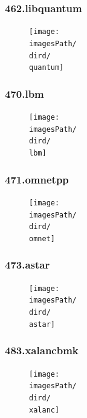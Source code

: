 \documentclass[12pt,a4paper]{article}
\newcommand{\imagesPath}{/home/nick/arch-ntua/ex02/graphs}
\newcommand{\quantum}{462.libquantum.cslab_branch_predictors.out.pdf}
\newcommand{\lbm}{470.lbm.cslab_branch_predictors.out.pdf}
\newcommand{\omnet}{471.omnetpp.cslab_branch_predictors.out.pdf}
\newcommand{\astar}{473.astar.cslab_branch_predictors.out.pdf}
\newcommand{\xalanc}{483.xalancbmk.cslab_branch_predictors.out.pdf}
\newcommand{\dird}{4.4}
\begin{document}
			\subsubsection{462.libquantum}
				\begin{figure}[H]
					\begin{center}
						 \texttt{[image: \\imagesPath/\\dird/\\quantum]}
					\end{center}
				\end{figure}
			
			\subsubsection{470.lbm}
				\begin{figure}[H]
					\begin{center}
						 \texttt{[image: \\imagesPath/\\dird/\\lbm]}
					\end{center}
				\end{figure}
			
			\subsubsection{471.omnetpp}
				\begin{figure}[H]
					\begin{center}
						 \texttt{[image: \\imagesPath/\\dird/\\omnet]}
					\end{center}
				\end{figure}
			
			\subsubsection{473.astar}
				\begin{figure}[H]
					\begin{center}
						 \texttt{[image: \\imagesPath/\\dird/\\astar]}
					\end{center}
				\end{figure}
			
			\subsubsection{483.xalancbmk}
				\begin{figure}[H]
					\begin{center}
						 \texttt{[image: \\imagesPath/\\dird/\\xalanc]}
					\end{center}
				\end{figure}
		
\end{document}
